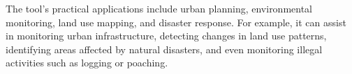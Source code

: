The tool's practical applications include urban planning, environmental monitoring, land use mapping, and disaster response. For example, it can assist in monitoring urban infrastructure, detecting changes in land use patterns, identifying areas affected by natural disasters, and even monitoring illegal activities such as logging or poaching.\\


\cleardoublepage
